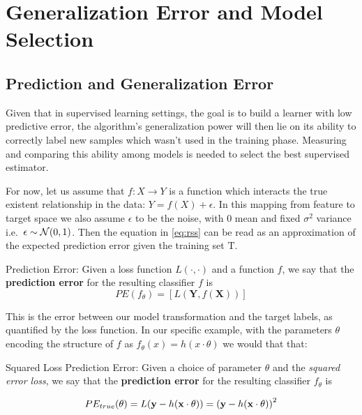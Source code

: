 
\chapter{Generalization Error and Model Selection }\label{cha:modelSelection}



\section{Prediction and Generalization Error}\label{subsection-generalizationError}

Given that in supervised learning settings, the goal is to build a learner with low predictive error, the algorithm's generalization power will then lie on its ability to correctly label new samples which wasn't used in the training phase. Measuring and comparing this ability among models is needed to select the best supervised estimator.

For now, let us assume that $f: X \rightarrow Y$ is a function which interacts the true existent relationship in the data: $Y = f(X) + \epsilon$. In this mapping from feature to target space we also assume $\epsilon$ to be the noise, with $0$ mean and fixed $\sigma^2$ variance i.e.\ $\epsilon \sim \operatorname{\mathcal{N}}(0,1) $. Then the equation in \cref{eq:rss} can be read as an approximation of the expected prediction error given the training set $\mathrm{T}$.


\begin{definition}{Prediction Error:}
	Given a loss function $L(\cdot,\cdot)$ and a function $f$, we say that the \textbf{prediction error} for the resulting classifier $f$ is
	\[
	PE(f_\theta)= \left[ L(\textbf{Y},f(\textbf{X}))\right]
	\]
\end{definition}

This is the error between our model transformation and the target labels, as quantified by the loss function.  In our specific example, with the parameters $\theta$ encoding the structure of $f$ as $f_\theta(x) = h(x \cdot \theta)$ we would that that:

\begin{definition}{Squared Loss Prediction Error:}
	Given a choice of parameter $\theta$ and the \textit{squared error loss}, we say that the \textbf{prediction error} for the resulting classifier $f_\theta$ is

	\begin{equation}
	PE_{true}(\theta) =L(\textbf{y} - h(\textbf{x} \cdot \theta) )  \\
	=  {(\textbf{y} - h(\textbf{x} \cdot \theta) )}^2
	\end{equation}

\end{definition}

